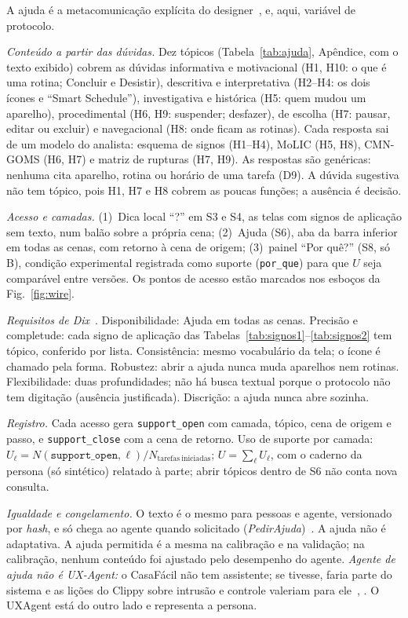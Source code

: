 \documentclass[conference]{IEEEtran}
\newcommand{\ev}[1]{\texttt{#1}}
\begin{document}
A ajuda é a metacomunicação explícita do designer~\cite{barbosa2010}, \cite{silveira2002} e, aqui, variável de protocolo.

\textit{Conteúdo a partir das dúvidas.} Dez tópicos (Tabela~\ref{tab:ajuda}, Apêndice, com o texto exibido) cobrem as dúvidas informativa e motivacional (H1, H10: o que é uma rotina; Concluir e Desistir), descritiva e interpretativa (H2--H4: os dois ícones e ``Smart Schedule''), investigativa e histórica (H5: quem mudou um aparelho), procedimental (H6, H9: suspender; desfazer), de escolha (H7: pausar, editar ou excluir) e navegacional (H8: onde ficam as rotinas). Cada resposta sai de um modelo do analista: esquema de signos (H1--H4), MoLIC (H5, H8), CMN-GOMS (H6, H7) e matriz de rupturas (H7, H9). As respostas são genéricas: nenhuma cita aparelho, rotina ou horário de uma tarefa (D9). A dúvida sugestiva não tem tópico, pois H1, H7 e H8 cobrem as poucas funções; a ausência é decisão.

\textit{Acesso e camadas.} (1)~Dica local ``?'' em S3 e S4, as telas com signos de aplicação sem texto, num balão sobre a própria cena; (2)~Ajuda (S6), aba da barra inferior em todas as cenas, com retorno à cena de origem; (3)~painel ``Por quê?'' (S8, só B), condição experimental registrada como suporte (\texttt{por\_que}) para que $U$ seja comparável entre versões. Os pontos de acesso estão marcados nos esboços da Fig.~\ref{fig:wire}.

\textit{Requisitos de Dix}~\cite[cap.~11]{dix2004}. Disponibilidade: Ajuda em todas as cenas. Precisão e completude: cada signo de aplicação das Tabelas~\ref{tab:signos1}--\ref{tab:signos2} tem tópico, conferido por lista. Consistência: mesmo vocabulário da tela; o ícone é chamado pela forma. Robustez: abrir a ajuda nunca muda aparelhos nem rotinas. Flexibilidade: duas profundidades; não há busca textual porque o protocolo não tem digitação (ausência justificada). Discrição: a ajuda nunca abre sozinha.

\textit{Registro.} Cada acesso gera \ev{support\_open} com camada, tópico, cena de origem e passo, e \ev{support\_close} com a cena de retorno. Uso de suporte por camada: $U_\ell = N(\ev{support\_open}, \ell)/N_{\mathrm{tarefas\ iniciadas}}$; $U = \sum_\ell U_\ell$, com o caderno da persona (só sintético) relatado à parte; abrir tópicos dentro de S6 não conta nova consulta.

\textit{Igualdade e congelamento.} O texto é o mesmo para pessoas e agente, versionado por \textit{hash}, e só chega ao agente quando solicitado (\textit{PedirAjuda})~\cite{lara2026p3}. A ajuda não é adaptativa. A ajuda permitida é a mesma na calibração e na validação; na calibração, nenhum conteúdo foi ajustado pelo desempenho do agente. \textit{Agente de ajuda não é UX-Agent:} o CasaFácil não tem assistente; se tivesse, faria parte do sistema e as lições do Clippy sobre intrusão e controle valeriam para ele~\cite{dix2004}, \cite{preece2002}. O UXAgent está do outro lado e representa a persona.
\end{document}
